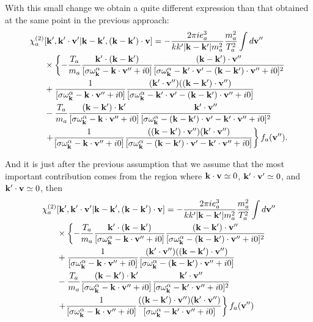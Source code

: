 \documentclass[12pt,a4paper,ruledheader]{report}
\begin{document}
\begin{appendix}
With this small change we obtain a quite different expression than that obtained
at the same point in the previous approach:
\begin{equation}
\begin{split}
\chi_a^{(2)}&[{\bf k'},{\bf k'\cdot v'}|{\bf k-k'},({\bf k-k'})\cdot{\bf v}]
=-\frac{2\pi ie_a^3}{k k'|{\bf k-k'}|m_a^2}\frac{m_a^2}{T_a^2} \int d{\bf v''}\\
&\times\left\{-\frac{T_a}{m_a}\frac{{\bf k'}\cdot({\bf k-k'})}
{[\sigma\omega_{\bf k}^\alpha-{\bf k}\cdot{\bf v''}+i0]}
\frac{({\bf k-k'})\cdot{\bf v''}}
{[\sigma\omega_{\bf k}^\alpha-{\bf k'}\cdot {\bf v'}
-({\bf k-k'})\cdot{\bf v''}+i0]^2} \right.\\
& + \frac{1}
{[\sigma\omega_{\bf k}^\alpha-{\bf k}\cdot{\bf v''}+i0]}
\frac{({\bf k'}\cdot{\bf v''})
(({\bf k-k'})\cdot{\bf v''})}
{[\sigma\omega_{\bf k}^\alpha-{\bf k'}\cdot {\bf v'}
-({\bf k-k'})\cdot{\bf v''}+i0]}\\
& -\frac{T_a}{m_a} \frac{({\bf k-k'})\cdot {\bf k'}}
{[\sigma\omega_{\bf k}^\alpha-{\bf k}\cdot{\bf v''}+i0]}
\frac{{\bf k'}\cdot{\bf v''}}
{[\sigma\omega_{\bf k}^\alpha- ({\bf k- k'})\cdot{\bf v'}
-{\bf k'}\cdot{\bf v''}+i0]^2}\\
&\left. + \frac{1}
{[\sigma\omega_{\bf k}^\alpha-{\bf k}\cdot{\bf v''}+i0]}
\frac{(({\bf k-k'})\cdot{\bf v''})
({\bf k'}\cdot{\bf v''})}
{[\sigma\omega_{\bf k}^\alpha- ({\bf k- k'})\cdot{\bf v'}
-{\bf k'}\cdot{\bf v''}+i0]}
\right\} f_a({\bf v''}).
\end{split}
\end{equation}

And it is just after the previous assumption that we assume that the most
important contribution comes from the region where
${\bf k}\cdot {\bf v}\simeq 0$, ${\bf k'}\cdot{\bf v'}\simeq 0$,
and ${\bf k'}\cdot {\bf v}\simeq 0$, then
\begin{equation}
\begin{split}
\label{chi2,2b}
\chi_a^{(2)}&[{\bf k'},{\bf k'\cdot v'}|{\bf k-k'},({\bf k-k'})\cdot{\bf v}]
=-\frac{2\pi ie_a^3}{k k'|{\bf k-k'}|m_a^2}\frac{m_a^2}{T_a^2}\int d{\bf v''}\\
&\times \left\{-\frac{T_a}{m_a}\frac{{\bf k'}\cdot({\bf k-k'})}
{[\sigma\omega_{\bf k}^\alpha-{\bf k}\cdot{\bf v''}+i0]}
\frac{({\bf k-k'})\cdot{\bf v''}}
{[\sigma\omega_{\bf k}^\alpha
-({\bf k-k'})\cdot{\bf v''}+i0]^2} \right.\\
& + \frac{1}
{[\sigma\omega_{\bf k}^\alpha-{\bf k}\cdot{\bf v''}+i0]}
\frac{({\bf k'}\cdot{\bf v''})
(({\bf k-k'})\cdot{\bf v''})}
{[\sigma\omega_{\bf k}^\alpha-({\bf k-k'})\cdot{\bf v''}+i0]}\\
& -\frac{T_a}{m_a} \frac{({\bf k-k'})\cdot {\bf k'}}
{[\sigma\omega_{\bf k}^\alpha-{\bf k}\cdot{\bf v''}+i0]}
\frac{{\bf k'}\cdot{\bf v''}}
{[\sigma\omega_{\bf k}^\alpha-{\bf k'}\cdot{\bf v''}+i0]^2}\\
&\left. + \frac{1}
{[\sigma\omega_{\bf k}^\alpha-{\bf k}\cdot{\bf v''}+i0]}
\frac{(({\bf k-k'})\cdot{\bf v''})
({\bf k'}\cdot{\bf v''})}
{[\sigma\omega_{\bf k}^\alpha
-{\bf k'}\cdot{\bf v''}+i0]}
\right\} f_a({\bf v''})
\end{split}
\end{equation}


\end{appendix}
\end{document}
